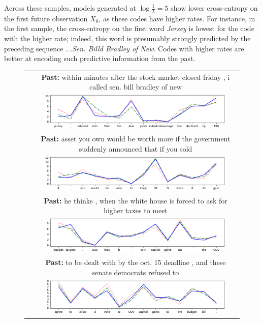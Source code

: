 \documentclass[entropy,article,submit,moreauthors,pdftex,10pt,a4paper]{Definitions/mdpi}
\begin{document}
Across these samples, models generated at $\log \frac{1}{\lambda} = 5$ show lower cross-entropy on the first future observation $X_0$, as these codes have higher rates.
For instance, in the first sample, the cross-entropy on the first word \emph{Jersey} is lowest for the code with the higher rate; indeed, this word is presumably strongly predicted by the preceding sequence \emph{...Sen. Billd Bradley of New}.
Codes with higher rates are better at encoding such predictive information from the past. 


\begin{figure}
\centering
\begin{tabular}{cc}
&\textbf{Past:} within minutes after the stock market closed friday , i called sen. bill bradley of new \\
&\includegraphics[width=0.9\textwidth]{code/nprd/figures/sample_0.png}\\
&\textbf{Past:} asset you own would be worth more if the government suddenly announced that if you sold \\
&\includegraphics[width=0.9\textwidth]{code/nprd/figures/sample_20.png}\\
&\textbf{Past:} he thinks , when the white house is forced to ask for higher taxes to meet \\
&\includegraphics[width=0.9\textwidth]{code/nprd/figures/sample_31.png} \\
&\textbf{Past:} to be dealt with by the oct. 15 deadline , and these senate democrats refused to \\
&\includegraphics[width=0.9\textwidth]{code/nprd/figures/sample_6.png}
\end{tabular}


\end{figure}
\end{document}
